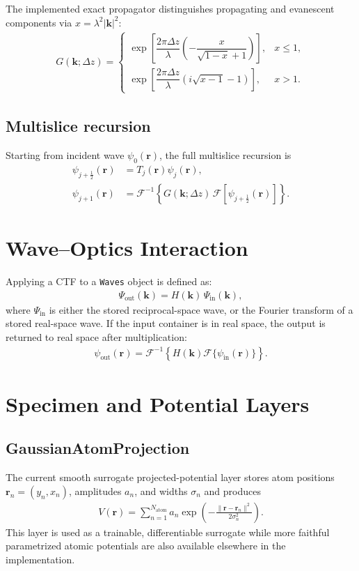 \documentclass[11pt]{article}
\begin{document}
The implemented exact propagator distinguishes propagating and evanescent components via
$x = \lambda^2 |\mathbf{k}|^2$:
\begin{align}
  G(\mathbf{k};\Delta z) =
  \begin{cases}
    \exp\!\left[
      \dfrac{2\pi \Delta z}{\lambda}
      \left(
        -\dfrac{x}{\sqrt{1-x}+1}
      \right)
    \right], & x \le 1, \\
    \exp\!\left[
      \dfrac{2\pi \Delta z}{\lambda}
      \left(
        i\sqrt{x-1}-1
      \right)
    \right], & x > 1.
  \end{cases}
\end{align}

\subsection{Multislice recursion}
Starting from incident wave $\psi_0(\mathbf{r})$, the full multislice recursion is
\begin{align}
  \psi_{j+\frac{1}{2}}(\mathbf{r}) &= T_j(\mathbf{r})\psi_j(\mathbf{r}), \\
  \psi_{j+1}(\mathbf{r}) &= \mathcal{F}^{-1}\left\{
    G(\mathbf{k};\Delta z)\,
    \mathcal{F}\left[\psi_{j+\frac{1}{2}}(\mathbf{r})\right]
  \right\}.
\end{align}

\section{Wave--Optics Interaction}
Applying a CTF to a \texttt{Waves} object is defined as:
\begin{align}
  \Psi_{\mathrm{out}}(\mathbf{k})
  = H(\mathbf{k})\,\Psi_{\mathrm{in}}(\mathbf{k}),
\end{align}
where $\Psi_{\mathrm{in}}$ is either the stored reciprocal-space wave, or the Fourier
transform of a stored real-space wave.  If the input container is in real space, the
output is returned to real space after multiplication:
\begin{align}
  \psi_{\mathrm{out}}(\mathbf{r})
  = \mathcal{F}^{-1}\left\{
    H(\mathbf{k}) \mathcal{F}\{\psi_{\mathrm{in}}(\mathbf{r})\}
  \right\}.
\end{align}

\section{Specimen and Potential Layers}
\subsection{GaussianAtomProjection}
The current smooth surrogate projected-potential layer stores atom positions
$\mathbf{r}_n = (y_n, x_n)$, amplitudes $a_n$, and widths $\sigma_n$ and produces
\begin{align}
  V(\mathbf{r})
  = \sum_{n=1}^{N_{\mathrm{atom}}}
    a_n
    \exp\!\left(
      -\frac{\|\mathbf{r}-\mathbf{r}_n\|^2}{2\sigma_n^2}
    \right).
\end{align}
This layer is used as a trainable, differentiable surrogate while more faithful
parametrized atomic potentials are also available elsewhere in the implementation.
\end{document}
